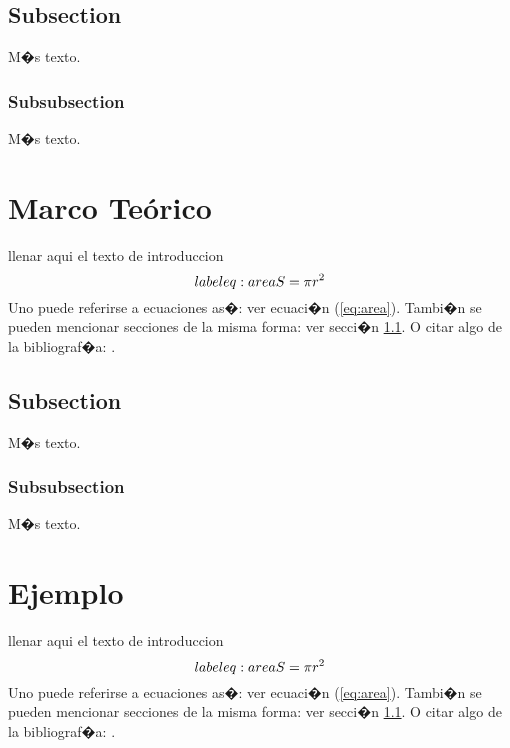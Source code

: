 \documentclass{article}
\theoremstyle{definition}
\theoremstyle{remark}
\begin{document}
\subsection{Subsection}\label{sec:nada}

M�s texto.

\subsubsection{Subsubsection}\label{sec:nada2}

M�s texto.





\section{Marco Te\'orico}

llenar aqui el texto de introduccion
\begin{equation}\\label{eq:area}
  S = \pi r^2
\end{equation}
Uno puede referirse a ecuaciones as�: ver ecuaci�n (\ref{eq:area}).
Tambi�n se pueden mencionar secciones de la misma forma: ver secci�n
\ref{sec:nada}. O citar algo de la bibliograf�a: \cite{Cd94}.

\subsection{Subsection}\label{sec:nada}

M�s texto.

\subsubsection{Subsubsection}\label{sec:nada2}

M�s texto.





\section{Ejemplo}

llenar aqui el texto de introduccion
\begin{equation}\\label{eq:area}
  S = \pi r^2
\end{equation}
Uno puede referirse a ecuaciones as�: ver ecuaci�n (\ref{eq:area}).
Tambi�n se pueden mencionar secciones de la misma forma: ver secci�n
\ref{sec:nada}. O citar algo de la bibliograf�a: \cite{Cd94}.
\end{document}
